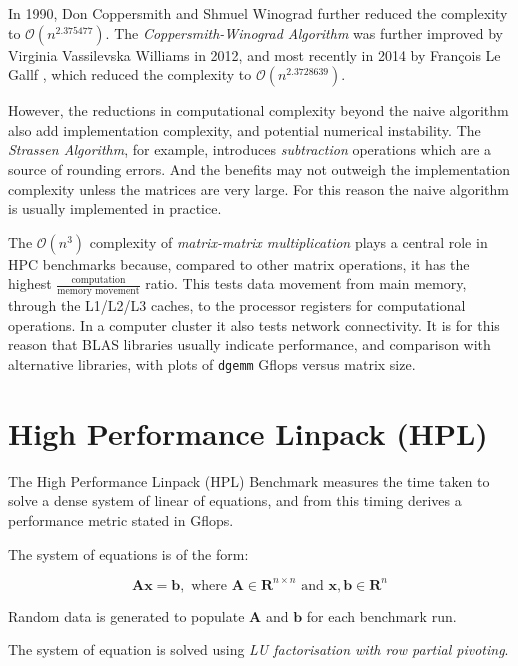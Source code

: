 In 1990, Don Coppersmith and Shmuel Winograd \cite{coppersmith-winograd} further reduced the complexity to $\mathcal{O}(n^{2.375477})$. The \emph{Coppersmith-Winograd Algorithm} was further improved by Virginia Vassilevska Williams \cite{williams} in 2012, and most recently in 2014 by François Le Gallf \cite{le-gall}, which reduced the complexity to $\mathcal {O}(n^{2.3728639})$.

However, the reductions in computational complexity beyond the naive algorithm also add implementation complexity, and potential numerical instability. The \emph{Strassen Algorithm}, for example, introduces \emph{subtraction} operations which are a source of rounding errors. And the benefits may not outweigh the implementation complexity unless the matrices are very large. For this reason the naive algorithm is usually implemented in practice.    

The $\mathcal{O}(n^3)$ complexity of \emph{matrix-matrix multiplication} plays a central role in HPC benchmarks because, compared to other matrix operations, it has the highest $\frac{\text{computation}}{\text{memory movement}}$ ratio. This tests data movement from main memory, through the L1/L2/L3 caches, to the processor registers for computational operations. In a computer cluster it also tests network connectivity. It is for this reason that BLAS libraries usually indicate performance, and comparison with alternative libraries, with plots of \verb|dgemm| Gflops versus matrix size.


%
%
\section{High Performance Linpack (HPL)}

The High Performance Linpack (HPL) Benchmark \cite{linpack-ppf} measures the time taken to solve a dense system of linear of equations, and from this timing derives a performance metric stated in Gflops. 

The system of equations is of the form:

\begin{equation}
\mathbf{Ax} = \mathbf{b},\text{ where }\mathbf{A} \in \mathbf{R}^{n\times n}\text{ and }\mathbf{x}, \mathbf{b} \in \mathbf{R}^n
\end{equation} 

Random data is generated to populate $\mathbf{A}$ and $\mathbf{b}$ for each benchmark run.

The system of equation is solved using \emph{LU factorisation with row partial pivoting}.

